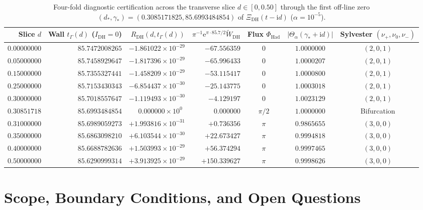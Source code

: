 \documentclass[11pt,reqno]{amsart}
\theoremstyle{definition}
\theoremstyle{remark}
\numberwithin{equation}{section}
\newcommand{\ee}{\mathrm{e}}
\newcommand{\ii}{\mathrm{i}}
\newcommand{\DHf}{\mathrm{DH}}
\begin{document}
\begin{table}[t]
\centering
\caption{Four-fold diagnostic certification across the transverse slice $d \in [0, 0.50]$ through the first off-line zero $(d_*, \gamma_*) = (0.3085171825, 85.6993484854)$ of $\Xi_{\DHf}(t - \ii d)$ ($\alpha = 10^{-5}$).}\label{tab:fourfold_diagnostics}
\scriptsize
\setlength{\tabcolsep}{3.0pt}
\begin{tabular}{@{}rrrrccc@{}}
\toprule
Slice $d$ & Wall $t_\Gamma(d)$ ($I_{\DHf}=0$) & $R_{\DHf}(d, t_\Gamma(d))$ & $\pi^{-1}\ee^{\pi\cdot 85.7/2}\widetilde{W}_{\DHf}$ & Flux $\Phi_{\mathrm{Had}}$ & $|\Theta_\alpha(\gamma_*+\ii d)|$ & Sylvester $(\nu_+, \nu_0, \nu_-)$ \\
\midrule
$0.00000000$ & $85.7472008265$ & $-1.861022 \times 10^{-29}$ & $-67.556359$ & $0$ & $1.0000000$ & $(2, 0, 1)$ \\
$0.05000000$ & $85.7458929647$ & $-1.817396 \times 10^{-29}$ & $-65.996433$ & $0$ & $1.0000207$ & $(2, 0, 1)$ \\
$0.15000000$ & $85.7355327441$ & $-1.458209 \times 10^{-29}$ & $-53.115417$ & $0$ & $1.0000800$ & $(2, 0, 1)$ \\
$0.25000000$ & $85.7153430343$ & $-6.854437 \times 10^{-30}$ & $-25.143775$ & $0$ & $1.0003018$ & $(2, 0, 1)$ \\
$0.30000000$ & $85.7018557647$ & $-1.119493 \times 10^{-30}$ & $-4.129197$ & $0$ & $1.0023129$ & $(2, 0, 1)$ \\
$0.30851718$ & $85.6993484854$ & $0.000000 \times 10^{0\phantom{0}}$ & $0.000000$ & $\pi/2$ & $1.0000000$ & Bifurcation \\
$0.31000000$ & $85.6989059273$ & $+1.993816 \times 10^{-31}$ & $+0.736356$ & $\pi$ & $0.9865655$ & $(3, 0, 0)$ \\
$0.35000000$ & $85.6863098210$ & $+6.103544 \times 10^{-30}$ & $+22.673427$ & $\pi$ & $0.9994818$ & $(3, 0, 0)$ \\
$0.40000000$ & $85.6688782636$ & $+1.503993 \times 10^{-29}$ & $+56.374294$ & $\pi$ & $0.9997465$ & $(3, 0, 0)$ \\
$0.50000000$ & $85.6290999314$ & $+3.913925 \times 10^{-29}$ & $+150.339627$ & $\pi$ & $0.9998626$ & $(3, 0, 0)$ \\
\bottomrule
\end{tabular}
\end{table}

\section{Scope, Boundary Conditions, and Open Questions}\label{sec:scope}
\end{document}
